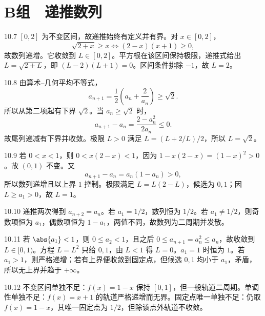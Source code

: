 \section*{B组　递推数列}

\begin{solution}{10.7}
\([0,2]\) 为不变区间，故递推始终有定义并有界。对 \(x\in[0,2]\)，
\[
 \sqrt{2+x}\ge x\Longleftrightarrow(2-x)(x+1)\ge0,
\]
故数列递增。它收敛到 \(L\in[0,2]\)。平方根在该区间保持极限，递推式给出
\(L=\sqrt{2+L}\)，即 \((L-2)(L+1)=0\)。区间条件排除 \(-1\)，故 \(L=2\)。
\end{solution}

\begin{solution}{10.8}
由算术--几何平均不等式，
\[
 a_{n+1}=\frac12\left(a_n+\frac2{a_n}\right)\ge\sqrt2.
\]
所以从第二项起有下界 \(\sqrt2\)。当 \(a_n\ge\sqrt2\) 时，
\[
 a_{n+1}-a_n=\frac{2-a_n^2}{2a_n}\le0.
\]
故尾列递减有下界并收敛。极限 \(L>0\) 满足
\(L=(L+2/L)/2\)，所以 \(L=\sqrt2\)。
\end{solution}

\begin{solution}{10.9}
若 \(0<x<1\)，则 \(0<x(2-x)<1\)，因为
\(1-x(2-x)=(1-x)^2>0\)。故 \((0,1)\) 不变。又
\[
 a_{n+1}-a_n=a_n(1-a_n)>0,
\]
所以数列递增且以上界 \(1\) 控制。极限满足
\(L=L(2-L)\)，候选为 \(0,1\)；因 \(L\ge a_1>0\)，故 \(L=1\)。
\end{solution}

\begin{solution}{10.10}
递推两次得到 \(a_{n+2}=a_n\)。若 \(a_1=1/2\)，数列恒为 \(1/2\)。若 \(a_1\ne1/2\)，则奇数项恒为 \(a_1\)，偶数项恒为 \(1-a_1\)，两值不同，故数列为二周期并发散。
\end{solution}

\begin{solution}{10.11}
若 \(\abs{a_1}<1\)，则 \(0\le a_2<1\)，且之后
\(0\le a_{n+1}=a_n^2\le a_n\)，故收敛到 \(L\in[0,1)\)。方程 \(L=L^2\) 只给 \(0,1\)，由 \(L<1\) 得 \(L=0\)。\(a_1=1\) 时恒为 \(1\)。若 \(a_1>1\)，则严格递增；若有上界便收敛到固定点，但候选 \(0,1\) 均小于 \(a_1\)，矛盾，所以无上界并趋于 \(+\infty\)。
\end{solution}

\begin{solution}{10.12}
不变区间单独不足：\(f(x)=1-x\) 保持 \([0,1]\)，但一般轨道二周期。单调性单独不足：\(f(x)=x+1\) 的轨道严格递增而无界。固定点唯一单独不足：仍取 \(f(x)=1-x\)，其唯一固定点为 \(1/2\)，但除该点外轨道不收敛。
\end{solution}

